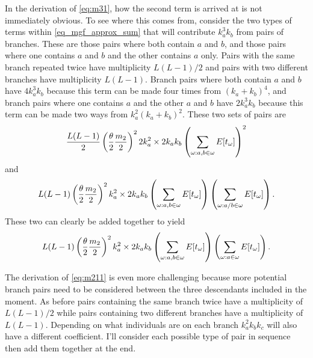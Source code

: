 In the derivation of \eqref{eq:m31}, how the second term is arrived at is not
immediately obvious. To see where this comes from, consider the two types of
terms within \eqref{eq_mgf_approx_sum} that will contribute $k_a^3k_b$ from
pairs of branches. These are those pairs where both contain $a$ and $b$, and
those pairs where one contains $a$ and $b$ and the other contains $a$ only.
Pairs with the same branch repeated twice have multiplicity $L(L-1)/2$ and pairs
with two different branches have multiplicity $L(L-1)$. Branch pairs where both
contain $a$ and $b$ have $4k_a^3k_b$ because this term can be made four times
from $(k_a+k_b)^4$, and branch pairs where one contains $a$ and the other $a$
and $b$ have $2k_a^3k_b$ because this term can be made two ways from
$k_a^2(k_a+k_b)^2$. These two sets of pairs are
\begin{equation*}
  \frac{L(L-1)}{2} \left( \frac{\theta}{2} \frac{m_2}{2}\right)^2 2k_a^2\times 2k_ak_b
  \left( \sum_{\omega: a,b \in \omega} E[t_\omega] \right)^2
\end{equation*}
and
\begin{equation*}
  L(L-1) \left( \frac{\theta}{2} \frac{m_2}{2}\right)^2 k_a^2\times 2k_ak_b
  \left( \sum_{\omega: a,b \in \omega} E[t_\omega] \right)\left( \sum_{\omega: a/b \in \omega} E[t_\omega] \right).
\end{equation*}
These two can clearly be added together to yield
\begin{equation*}
  L(L-1) \left( \frac{\theta}{2} \frac{m_2}{2}\right)^2 k_a^2\times 2k_ak_b
  \left( \sum_{\omega: a,b \in \omega} E[t_\omega] \right)\left( \sum_{\omega: a \in \omega} E[t_\omega] \right).
\end{equation*}

The derivation of \eqref{eq:m211} is even more challenging because more
potential branch pairs need to be considered between the three descendants
included in the moment. As before pairs containing the same branch twice have a
multiplicity of $L(L-1)/2$ while pairs containing two different branches have a
multiplicity of $L(L-1)$. Depending on what individuals are on each branch
$k_a^2k_bk_c$ will also have a different coefficient. I'll consider each
possible type of pair in sequence then add them together at the end.

